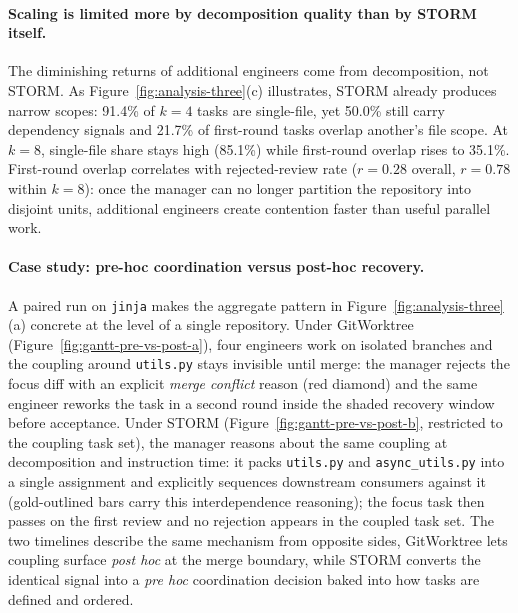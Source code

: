 \documentclass{article}
\begin{document}
  \paragraph{Scaling is limited more by decomposition quality than by STORM itself.}
  The diminishing returns of additional engineers come from decomposition, not STORM. As Figure~\ref{fig:analysis-three}(c) illustrates, STORM already produces narrow scopes: 91.4\% of $k{=}4$ tasks are single-file, yet 50.0\% still carry dependency signals and 21.7\% of first-round tasks overlap another's file scope. At $k{=}8$, single-file share stays high (85.1\%) while first-round overlap rises to 35.1\%. First-round overlap correlates with rejected-review rate ($r=0.28$ overall, $r=0.78$ within $k{=}8$): once the manager can no longer partition the repository into disjoint units, additional engineers create contention faster than useful parallel work. 


  \paragraph{Case study: pre-hoc coordination versus post-hoc recovery.}
  A paired run on \texttt{jinja} makes the aggregate pattern in Figure~\ref{fig:analysis-three}(a) concrete at the level of a single repository. Under GitWorktree (Figure~\ref{fig:gantt-pre-vs-post-a}), four engineers work on isolated branches and the coupling around \texttt{utils.py} stays invisible until merge: the manager rejects the focus diff with an explicit \emph{merge conflict} reason (red diamond) and the same engineer reworks the task in a second round inside the shaded recovery window before acceptance. Under STORM (Figure~\ref{fig:gantt-pre-vs-post-b}, restricted to the coupling task set), the manager reasons about the same coupling at decomposition and instruction time: it packs \texttt{utils.py} and \texttt{async\_utils.py} into a single assignment and explicitly sequences downstream consumers against it (gold-outlined bars carry this interdependence reasoning); the focus task then passes on the first review and no rejection appears in the coupled task set. The two timelines describe the same mechanism from opposite sides, GitWorktree lets coupling surface \emph{post hoc} at the merge boundary, while STORM converts the identical signal into a \emph{pre hoc} coordination decision baked into how tasks are defined and ordered.
\end{document}
